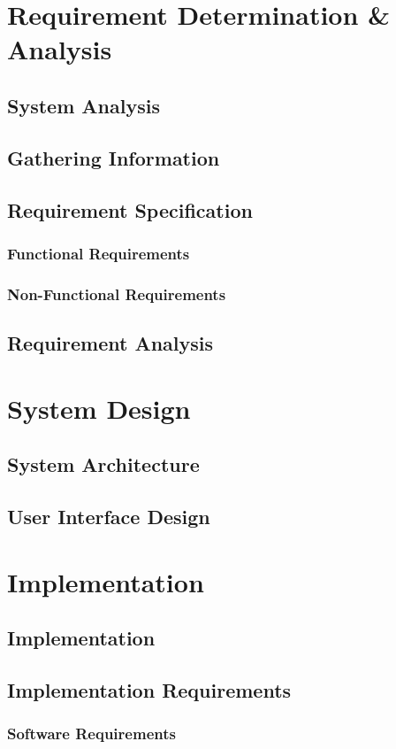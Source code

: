 \documentclass{article}
\begin{document}
	\section{Requirement Determination \& Analysis}
		\subsection{System Analysis}
		\subsection{Gathering Information}
		\subsection{Requirement Specification}
			\subsubsection{Functional Requirements}
			\subsubsection{Non-Functional Requirements}
		\subsection{Requirement Analysis}
		\newpage	
	\section{System Design}
		\subsection{System Architecture}
		\subsection{User Interface Design}
		\newpage	
	\section{Implementation}
		\subsection{Implementation}
		\subsection{Implementation Requirements}
			\subsubsection{Software Requirements}
\end{document}
